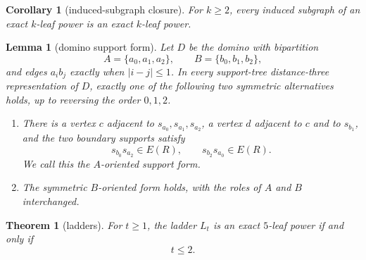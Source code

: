 \documentclass[10pt,a4paper]{amsart}
\newtheorem{lemma}{Lemma}
\newtheorem{corollary}{Corollary}
\newtheorem{theorem}{Theorem}
\begin{document}
\begin{corollary}[induced-subgraph closure]\label{cor:induced-closure}
For $k\ge2$, every induced subgraph of an exact $k$-leaf power is an exact $k$-leaf power.
\end{corollary}

\begin{lemma}[domino support form]\label{lem:domino-support-form}
Let $D$ be the domino with bipartition
\[
 A=\{a_0,a_1,a_2\},\qquad B=\{b_0,b_1,b_2\},
\]
and edges $a_i b_j$ exactly when $|i-j|\le1$.  In every support-tree distance-three representation of $D$, exactly one of the following two symmetric alternatives holds, up to reversing the order $0,1,2$.
\begin{enumerate}[label=\textup{(\alph*)}]
\item There is a vertex $c$ adjacent to $s_{a_0},s_{a_1},s_{a_2}$, a vertex $d$ adjacent to $c$ and to $s_{b_1}$, and the two boundary supports satisfy
\[
 s_{b_0}s_{a_2}\in E(R),\qquad s_{b_2}s_{a_0}\in E(R).
\]
We call this the $A$-oriented support form.
\item The symmetric $B$-oriented form holds, with the roles of $A$ and $B$ interchanged.
\end{enumerate}
\end{lemma}

\begin{theorem}[ladders]\label{thm:ladder}
For $t\ge1$, the ladder $L_t$ is an exact $5$-leaf power if and only if
\[
 t\le2.
\]
\end{theorem}
\end{document}
